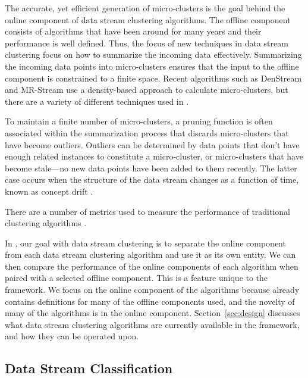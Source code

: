 \documentclass[nojss]{jss}
\begin{document}
The accurate, yet efficient generation of micro-clusters is the goal behind the online component of data stream clustering algorithms. The offline component consists of algorithms that have been around for many years and their performance is well defined. Thus, the focus of new techniques in data stream clustering focus on how to summarize the incoming data effectively. Summarizing the incoming data points into micro-clusters ensures that the input to the offline component is constrained to a finite space. Recent algorithms such as DenStream \citep{stream:Cao+Ester+Qian+Zhou:2006} and MR-Stream \citep{stream:Wan+Ng+Dang+Yu+Zhang:2009} use a density-based approach to calculate micro-clusters, but there are a variety of different techniques used in \citep{stream:Guha+Meyerson+Mishra+Motwani+O'Callaghan:2003, stream:Aggarwal:2009, stream:Hahsler+Dunham:2010c, stream:Aggarwal+Han+Wang+Yu:2003}. 


To maintain a finite number of micro-clusters, a pruning function is often associated within the summarization process that discards micro-clusters that have become outliers. Outliers can be determined by data points that don't have enough related instances to constitute a micro-cluster, or micro-clusters that have become stale---no new data points have been added to them recently. The latter case occurs when the structure of the data stream changes as a function of time, known as concept drift \citep{stream:Masud+Chen+Khan+Aggarwal+Gao+Han+Thuraisingham:2010}.

There are a number of metrics used to measure the performance of traditional clustering algorithms \citep{stream:Dunham:2002}. 


In , our goal with data stream clustering is to separate the online component from each data stream clustering algorithm and use it as its own entity. We can then compare the performance of the online components of each algorithm when paired with a selected offline component. This is a feature unique to the  framework. We focus on the online component of the algorithms because  already contains definitions for many of the offline components used, and the novelty of many of the algorithms is in the online component. Section~\ref{sec:design} discusses what data stream clustering algorithms are currently available in the framework, and how they can be operated upon.

\subsection{Data Stream Classification}
\label{sec:background:dscl}
\end{document}
